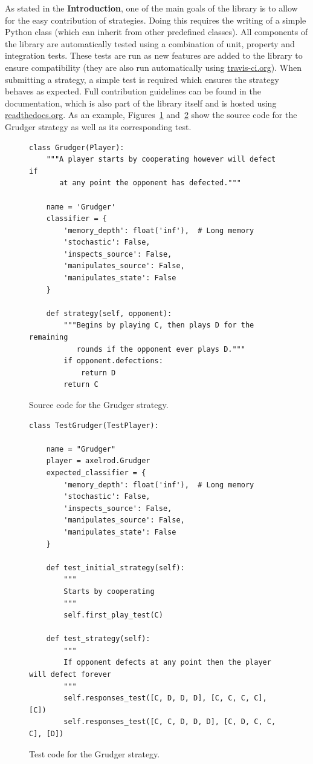 \documentclass{jors}
\begin{document}
As stated in the \textbf{Introduction}, one of the main goals of the library is
to allow for the easy contribution of strategies. Doing this requires the
writing of a simple Python class (which can inherit from other predefined
classes). All components of the library are automatically tested using a
combination of unit, property and integration tests. These tests are run as new
features are added to the library to ensure compatibility (they are also run
automatically using \url{travis-ci.org}). When submitting a strategy, a
simple test is required which ensures the strategy behaves as expected.  Full
contribution guidelines can be found in the documentation, which is also part of
the library itself and is hosted using \url{readthedocs.org}.  As an example,
Figures~\ref{fig:grudger} and~\ref{fig:grudger_test} show the source code for
the Grudger strategy as well as its corresponding test.

\begin{figure}[!hbtp]
    \begin{verbatim}
class Grudger(Player):
    """A player starts by cooperating however will defect if
       at any point the opponent has defected."""

    name = 'Grudger'
    classifier = {
        'memory_depth': float('inf'),  # Long memory
        'stochastic': False,
        'inspects_source': False,
        'manipulates_source': False,
        'manipulates_state': False
    }

    def strategy(self, opponent):
        """Begins by playing C, then plays D for the remaining
           rounds if the opponent ever plays D."""
        if opponent.defections:
            return D
        return C
    \end{verbatim}
    \caption{Source code for the Grudger strategy.}
    \label{fig:grudger}
\end{figure}


\begin{figure}[!hbtp]
    \begin{verbatim}
class TestGrudger(TestPlayer):

    name = "Grudger"
    player = axelrod.Grudger
    expected_classifier = {
        'memory_depth': float('inf'),  # Long memory
        'stochastic': False,
        'inspects_source': False,
        'manipulates_source': False,
        'manipulates_state': False
    }

    def test_initial_strategy(self):
        """
        Starts by cooperating
        """
        self.first_play_test(C)

    def test_strategy(self):
        """
        If opponent defects at any point then the player will defect forever
        """
        self.responses_test([C, D, D, D], [C, C, C, C], [C])
        self.responses_test([C, C, D, D, D], [C, D, C, C, C], [D])
    \end{verbatim}
    \caption{Test code for the Grudger strategy.}
    \label{fig:grudger_test}
\end{figure}
\end{document}
